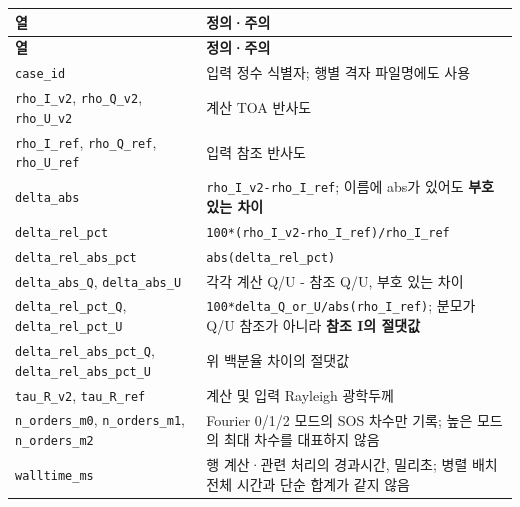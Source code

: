 {\TableFont
\begin{longtable}{@{}>{\raggedright\arraybackslash}p{}>{\raggedright\arraybackslash}p{}@{}}
\toprule
\textbf{열} & \textbf{정의·주의} \\
\midrule
\endfirsthead
\toprule
\textbf{열} & \textbf{정의·주의} \\
\midrule
\endhead
\bottomrule
\endfoot
\texttt{case\_\allowbreak{}id} & 입력 정수 식별자; 행별 격자 파일명에도 사용 \\
\texttt{rho\_\allowbreak{}I\_\allowbreak{}v2}, \texttt{rho\_\allowbreak{}Q\_\allowbreak{}v2}, \texttt{rho\_\allowbreak{}U\_\allowbreak{}v2} & 계산 TOA 반사도 \\
\texttt{rho\_\allowbreak{}I\_\allowbreak{}ref}, \texttt{rho\_\allowbreak{}Q\_\allowbreak{}ref}, \texttt{rho\_\allowbreak{}U\_\allowbreak{}ref} & 입력 참조 반사도 \\
\texttt{delta\_\allowbreak{}abs} & \texttt{rho\_\allowbreak{}I\_\allowbreak{}v2-rho\_\allowbreak{}I\_\allowbreak{}ref}; 이름에 abs가 있어도 \textbf{부호 있는 차이} \\
\texttt{delta\_\allowbreak{}rel\_\allowbreak{}pct} & \texttt{100*(rho\_\allowbreak{}I\_\allowbreak{}v2-rho\_\allowbreak{}I\_\allowbreak{}ref)/\allowbreak{}rho\_\allowbreak{}I\_\allowbreak{}ref} \\
\texttt{delta\_\allowbreak{}rel\_\allowbreak{}abs\_\allowbreak{}pct} & \texttt{abs(delta\_\allowbreak{}rel\_\allowbreak{}pct)} \\
\texttt{delta\_\allowbreak{}abs\_\allowbreak{}Q}, \texttt{delta\_\allowbreak{}abs\_\allowbreak{}U} & 각각 계산 Q/U - 참조 Q/U, 부호 있는 차이 \\
\texttt{delta\_\allowbreak{}rel\_\allowbreak{}pct\_\allowbreak{}Q}, \texttt{delta\_\allowbreak{}rel\_\allowbreak{}pct\_\allowbreak{}U} & \texttt{100*delta\_\allowbreak{}Q\_\allowbreak{}or\_\allowbreak{}U/\allowbreak{}abs(rho\_\allowbreak{}I\_\allowbreak{}ref)}; 분모가 Q/U 참조가 아니라 \textbf{참조 I의 절댓값} \\
\texttt{delta\_\allowbreak{}rel\_\allowbreak{}abs\_\allowbreak{}pct\_\allowbreak{}Q}, \texttt{delta\_\allowbreak{}rel\_\allowbreak{}abs\_\allowbreak{}pct\_\allowbreak{}U} & 위 백분율 차이의 절댓값 \\
\texttt{tau\_\allowbreak{}R\_\allowbreak{}v2}, \texttt{tau\_\allowbreak{}R\_\allowbreak{}ref} & 계산 및 입력 Rayleigh 광학두께 \\
\texttt{n\_\allowbreak{}orders\_\allowbreak{}m0}, \texttt{n\_\allowbreak{}orders\_\allowbreak{}m1}, \texttt{n\_\allowbreak{}orders\_\allowbreak{}m2} & Fourier 0/1/2 모드의 SOS 차수만 기록; 높은 모드의 최대 차수를 대표하지 않음 \\
\texttt{walltime\_\allowbreak{}ms} & 행 계산·관련 처리의 경과시간, 밀리초; 병렬 배치 전체 시간과 단순 합계가 같지 않음 \\
\end{longtable}
}

